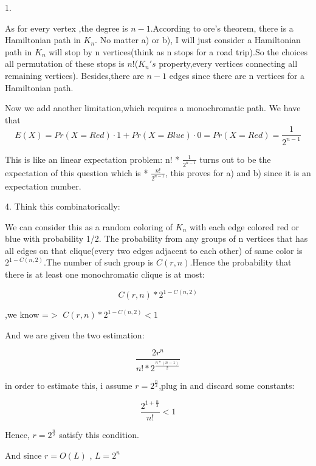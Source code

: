 \documentclass{article}
\begin{document}
1.

As for every vertex ,the degree is $n-1$.According to ore's theorem, there is a Hamiltonian path in $K_n$.
No matter a) or b), I will just consider a Hamiltonian path in $K_n$ will stop by n vertices(think as n stops for a road trip).So the choices all permutation of these stops is $n!$($K_n's$ property,every vertices connecting all remaining vertices). Besides,there are $n-1$ edges since there are n vertices for a Hamiltonian path.

Now we add another limitation,which requires a monochromatic path. We have that $$E(X) = Pr(X = Red) · 1 + Pr(X = Blue) · 0 = Pr(X = Red) = \frac{1}{2^{n-1}}$$

This is like an linear expectation problem: n! * $\frac{1}{2^{n-1}}$ turns out to be the expectation of this question which is  * $\frac{n!}{2^{n-1}}$, this proves for a) and b) since it is an expectation number.


4.
Think this combinatorically:

We can consider this as a random coloring of $K_n$ with each edge colored red or blue with probability 1/2. The probability from any groups of n vertices that has all edges on that clique(every two edges adjacent to each other) of same color is $2^{1-C(n,2)}$.The number of such group is $C(r,n)$.Hence the probability that there is at least one monochromatic clique is at most:

$$C(r,n)*2^{1-C(n,2)}$$

,we know =$>$ $C(r,n)*2^{1-C(n,2)} < 1$

And we are given the two estimation:

$$\frac{2r^n}{n!*2^{\frac{n*(n-1)}{2}}}$$

in order to estimate this, i assume $r = 2^{\frac{n}{2}}$,plug in and discard some constants:

$$\frac{2^{1+\frac{n}{2}}}{n!} < 1$$

Hence, $r = 2^{\frac{n}{2}}$ satisfy this condition.

And since $r = O(L)$ , $L = 2^n$
\end{document}

